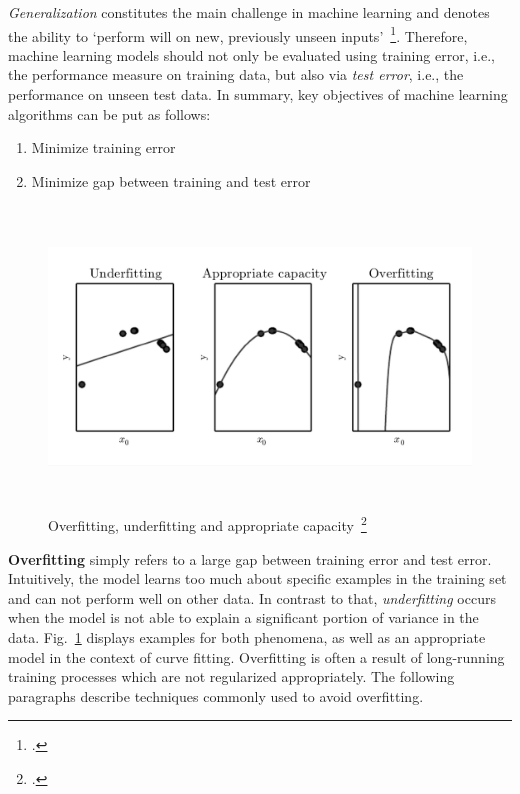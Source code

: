 \textit{Generalization} constitutes the main challenge in machine learning and
denotes the ability to `perform will on new, previously unseen inputs'~\footcite[110]{Goodfellow2016}.
Therefore, machine learning models should not only be evaluated using training
error, i.e., the performance measure on training data, but also via \textit{test
error}, i.e., the performance on unseen test data.
In summary, key objectives of machine learning algorithms can be put as follows:

\begin{enumerate}
  \item Minimize training error
  \item Minimize gap between training and test error
\end{enumerate}

\begin{figure}[h]
  \centering
  \includegraphics[height=8cm]{img/overfitting}
  \caption[Overfitting, underfitting and appropriate capacity]{Overfitting, underfitting and appropriate capacity~\footcite{Goodfellow2016}}
\label{fig:overfitting}
\end{figure}

\textbf{Overfitting} simply refers to a large gap between training error and test
error.
Intuitively, the model learns too much about specific examples in the training
set and can not perform well on other data.
In contrast to that, \textit{underfitting} occurs when the model is not able
to explain a significant portion of variance in the data.
Fig.~\ref{fig:overfitting} displays examples for both phenomena, as well as
an appropriate model in the context of curve fitting.
Overfitting is often a result of long-running training processes which are
not regularized appropriately.
The following paragraphs describe techniques commonly used to avoid overfitting.

